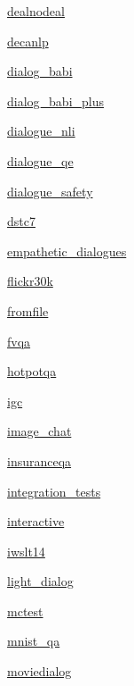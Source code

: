 \begin{DoxyCompactItemize}
\item 
 \hyperlink{namespaceparlai_1_1tasks_1_1dealnodeal}{dealnodeal}
\item 
 \hyperlink{namespaceparlai_1_1tasks_1_1decanlp}{decanlp}
\item 
 \hyperlink{namespaceparlai_1_1tasks_1_1dialog__babi}{dialog\+\_\+babi}
\item 
 \hyperlink{namespaceparlai_1_1tasks_1_1dialog__babi__plus}{dialog\+\_\+babi\+\_\+plus}
\item 
 \hyperlink{namespaceparlai_1_1tasks_1_1dialogue__nli}{dialogue\+\_\+nli}
\item 
 \hyperlink{namespaceparlai_1_1tasks_1_1dialogue__qe}{dialogue\+\_\+qe}
\item 
 \hyperlink{namespaceparlai_1_1tasks_1_1dialogue__safety}{dialogue\+\_\+safety}
\item 
 \hyperlink{namespaceparlai_1_1tasks_1_1dstc7}{dstc7}
\item 
 \hyperlink{namespaceparlai_1_1tasks_1_1empathetic__dialogues}{empathetic\+\_\+dialogues}
\item 
 \hyperlink{namespaceparlai_1_1tasks_1_1flickr30k}{flickr30k}
\item 
 \hyperlink{namespaceparlai_1_1tasks_1_1fromfile}{fromfile}
\item 
 \hyperlink{namespaceparlai_1_1tasks_1_1fvqa}{fvqa}
\item 
 \hyperlink{namespaceparlai_1_1tasks_1_1hotpotqa}{hotpotqa}
\item 
 \hyperlink{namespaceparlai_1_1tasks_1_1igc}{igc}
\item 
 \hyperlink{namespaceparlai_1_1tasks_1_1image__chat}{image\+\_\+chat}
\item 
 \hyperlink{namespaceparlai_1_1tasks_1_1insuranceqa}{insuranceqa}
\item 
 \hyperlink{namespaceparlai_1_1tasks_1_1integration__tests}{integration\+\_\+tests}
\item 
 \hyperlink{namespaceparlai_1_1tasks_1_1interactive}{interactive}
\item 
 \hyperlink{namespaceparlai_1_1tasks_1_1iwslt14}{iwslt14}
\item 
 \hyperlink{namespaceparlai_1_1tasks_1_1light__dialog}{light\+\_\+dialog}
\item 
 \hyperlink{namespaceparlai_1_1tasks_1_1mctest}{mctest}
\item 
 \hyperlink{namespaceparlai_1_1tasks_1_1mnist__qa}{mnist\+\_\+qa}
\item 
 \hyperlink{namespaceparlai_1_1tasks_1_1moviedialog}{moviedialog}

\end{DoxyCompactItemize}
